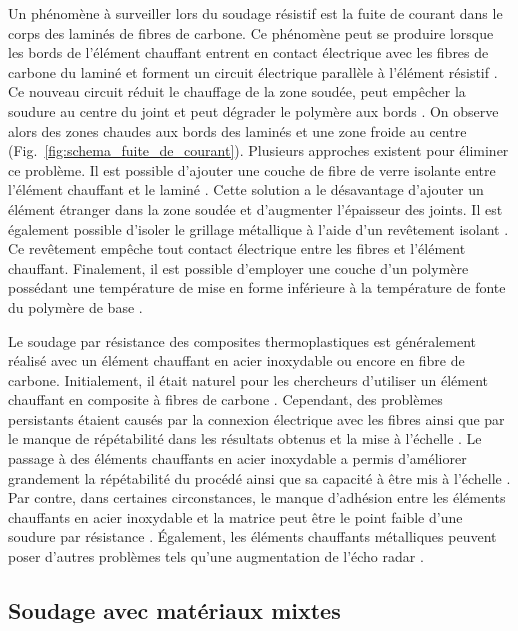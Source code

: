 Un phénomène à surveiller lors du soudage résistif est la fuite de courant dans le corps des laminés de fibres de carbone. 
Ce phénomène peut se produire lorsque les bords de l'élément chauffant entrent en contact électrique avec les fibres de carbone du laminé et forment un circuit électrique parallèle à l'élément résistif \cite{Hou1999a,Ageorges2000}. 
Ce nouveau circuit réduit le chauffage de la zone soudée, peut empêcher la soudure au centre du joint et peut dégrader le polymère aux bords \cite{Dube2008}. 
On observe alors des zones chaudes aux bords des laminés et une zone froide au centre (Fig.~\ref{fig:schema_fuite_de_courant}). 
Plusieurs approches existent pour éliminer ce problème. 
Il est possible d'ajouter une couche de fibre de verre isolante entre l'élément chauffant et le laminé \cite{Hou1999a}. 
Cette solution a le désavantage d'ajouter un élément étranger dans la zone soudée et d'augmenter l'épaisseur des joints. 
Il est également possible d'isoler le grillage métallique à l'aide d'un revêtement isolant \cite{Dube2008,Dube2009a}. 
Ce revêtement empêche tout contact électrique entre les fibres et l'élément chauffant. 
Finalement, il est possible d'employer une couche d'un polymère possédant une température de mise en forme inférieure à la température de fonte du polymère de base \cite{Stavrov2005a}. 

Le soudage par résistance des composites thermoplastiques est généralement réalisé avec un élément chauffant en acier inoxydable ou encore en fibre de carbone. 
Initialement, il était naturel pour les chercheurs d'utiliser un élément chauffant en composite à fibres de carbone \cite{Ageorges2000a,houghton1984bonding,Eveno1988}. 
Cependant, des problèmes persistants étaient causés par la connexion électrique avec les fibres ainsi que par le manque de répétabilité dans les résultats obtenus et la mise à l'échelle \cite{McKnight1997}. 
Le passage à des éléments chauffants en acier inoxydable a permis d'améliorer grandement la répétabilité du procédé ainsi que sa capacité à être mis à l'échelle \cite{Hou1999a}.  
Par contre, dans certaines circonstances, le manque d'adhésion entre les éléments chauffants en acier inoxydable et la matrice peut être le point faible d'une soudure par résistance \cite{Dube2007,Dube2012a,Dube2009a,Shi2014,Shi2015a}. 
Également, les éléments chauffants métalliques peuvent poser d'autres problèmes tels qu'une augmentation de l'écho radar \cite{Ageorges2001a}. 

\FloatBarrier
\subsection{Soudage avec matériaux mixtes}

